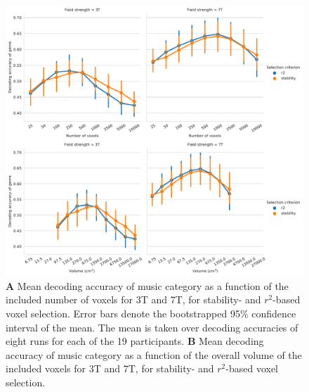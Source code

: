 \begin{figure}[H]
  \centering
  \includegraphics[width=\linewidth]{pics/decoding_genre_selection.pdf}

  \caption{\textbf{A} Mean decoding accuracy of music category as a function of
  the included number of voxels for 3T and 7T, for stability- and
  $r^2$-based voxel selection. Error bars denote the bootstrapped 95\%
  confidence interval of the mean. The mean is taken over decoding
  accuracies of eight runs for each of the 19 participants. \textbf{B} Mean
decoding accuracy of music category as a function of the overall volume of the
included voxels for 3T and 7T, for stability- and $r^2$-based voxel
selection.
}

 \label{fig:decoding_accuracy_selection}
\end{figure}






